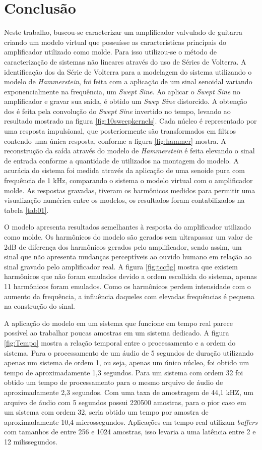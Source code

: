 \chapter{Conclusão}

Neste trabalho, buscou-se caracterizar um amplificador valvulado de guitarra criando um modelo virtual que possuísse as características principais do amplificador utilizado como molde. Para isso utilizou-se o método de caracterização de sistemas não lineares através do uso de Séries de Volterra. A identificação dos  da Série de Volterra para a modelagem do sistema utilizando o modelo de \textit{Hammerstein}, foi feita com a aplicação de um sinal senoidal variando exponencialmente na frequência, um \textit{Swept Sine}. Ao aplicar o \textit{Swept Sine} no amplificador e gravar sua saída, é obtido um \textit{Swep Sine} distorcido. A obtenção dos  é feita pela convolução do \textit{Swept Sine} invertido no tempo, levando ao resultado mostrado na figura \ref{fig:10sweepkernels}. Cada núcleo é representado por uma resposta impulsional, que posteriormente são transformados em filtros contendo uma única resposta, conforme a figura \ref{fig:hammer} mostra. A reconstrução da saída através do modelo de \textit{Hammerstein} é feita elevando o sinal de entrada conforme a quantidade de  utilizados na montagem do modelo. A acurácia do sistema foi medida através da aplicação de uma senoide pura com frequência de 1 kHz, comparando o sistema o modelo virtual com o amplificador molde. As respostas gravadas, tiveram os harmônicos medidos para permitir uma visualização numérica entre os modelos, os resultados foram contabilizados na tabela \ref{tab01}.

O modelo apresenta resultados semelhantes à resposta do amplificador utilizado como molde. Os harmônicos do modelo são gerados sem ultrapassar um valor de 2dB de diferença dos harmônicos gerados pelo amplificador, sendo assim, um sinal que não apresenta mudanças perceptíveis ao ouvido humano em relação ao sinal gravado pelo amplificador real. A figura \ref{fig:tccfig} mostra que existem harmônicos que não foram emulados devido a ordem escolhida do sistema, apenas 11 harmônicos foram emulados. Como os harmônicos perdem intensidade com o aumento da frequência, a influência daqueles com elevadas frequências é pequena na construção do sinal.

A aplicação do modelo em um sistema que funcione em tempo real parece possível ao trabalhar poucas amostras em um sistema dedicado. A figura \ref{fig:Tempo} mostra a relação temporal entre o processamento e a ordem do sistema. Para o processamento de um áudio de 5 segundos de duração utilizando apenas um sistema de ordem 1, ou seja, apenas um único núcleo, foi obtido um tempo de aproximadamente 1,3 segundos. Para um sistema com ordem 32 foi obtido um tempo de processamento para o mesmo arquivo de áudio de aproximadamente 2,3 segundos. Com uma taxa de amostragem de 44,1 kHZ, um arquivo de áudio com 5 segundos possui 220500 amostras, para o pior caso em um sistema com ordem 32, seria obtido um tempo por amostra de aproximadamente 10,4 microssegundos. Aplicações em tempo real utilizam \textit{buffers} com tamanhos de entre 256 e 1024 amostras, isso levaria  a uma latência entre 2 e 12 milissegundos.

